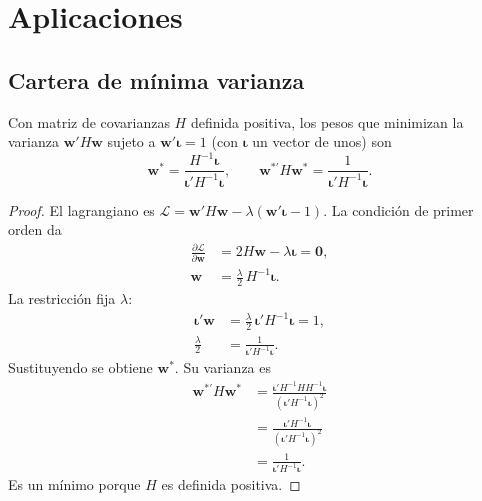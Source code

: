 \section{Aplicaciones}

\subsection{Cartera de mínima varianza}

\begin{proposicion}\label{prop:minvar}
Con matriz de covarianzas $H$ definida positiva, los pesos que minimizan la varianza $\mathbf w'H\mathbf w$ sujeto a
$\mathbf w'\boldsymbol\iota=1$ (con $\boldsymbol\iota$ un vector de unos) son
\[
  \mathbf w^*=\frac{H^{-1}\boldsymbol\iota}{\boldsymbol\iota'H^{-1}\boldsymbol\iota},\qquad
  \mathbf w^{*\prime}H\mathbf w^*=\frac{1}{\boldsymbol\iota'H^{-1}\boldsymbol\iota}.
\]
\end{proposicion}

\begin{proof}
El lagrangiano es $\mathcal L=\mathbf w'H\mathbf w-\lambda(\mathbf w'\boldsymbol\iota-1)$. La condición de
primer orden da
\begin{align*}
  \frac{\partial\mathcal L}{\partial\mathbf w} &= 2H\mathbf w-\lambda\boldsymbol\iota=\mathbf 0,\\
  \mathbf w &= \frac\lambda2\,H^{-1}\boldsymbol\iota .
\end{align*}
La restricción fija $\lambda$:
\begin{align*}
  \boldsymbol\iota'\mathbf w &= \frac\lambda2\,\boldsymbol\iota'H^{-1}\boldsymbol\iota=1,\\
  \frac\lambda2 &= \frac{1}{\boldsymbol\iota'H^{-1}\boldsymbol\iota}.
\end{align*}
Sustituyendo se obtiene $\mathbf w^*$. Su varianza es
\begin{align*}
  \mathbf w^{*\prime}H\mathbf w^* &= \frac{\boldsymbol\iota'H^{-1}HH^{-1}\boldsymbol\iota}{(\boldsymbol\iota'H^{-1}\boldsymbol\iota)^2}\\
                                  &= \frac{\boldsymbol\iota'H^{-1}\boldsymbol\iota}{(\boldsymbol\iota'H^{-1}\boldsymbol\iota)^2}\\
                                  &= \frac{1}{\boldsymbol\iota'H^{-1}\boldsymbol\iota}.
\end{align*}
Es un mínimo porque $H$ es definida positiva.
\end{proof}

